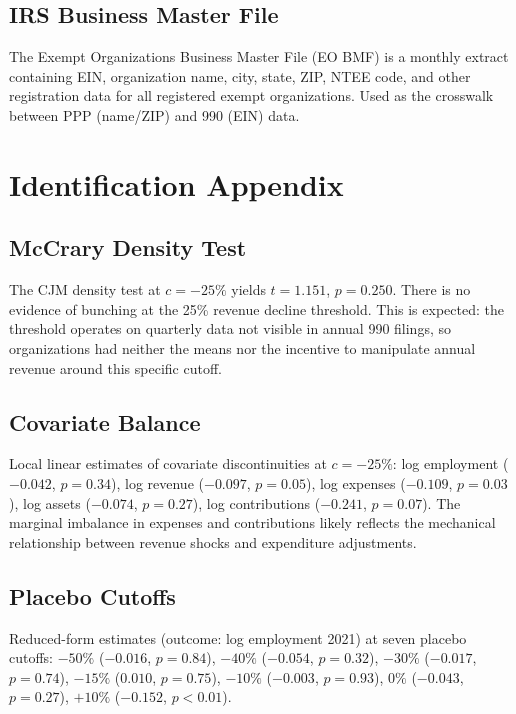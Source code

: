 \documentclass[12pt]{article}
\begin{document}
\subsection{IRS Business Master File}

The Exempt Organizations Business Master File (EO BMF) is a monthly extract containing EIN, organization name, city, state, ZIP, NTEE code, and other registration data for all registered exempt organizations. Used as the crosswalk between PPP (name/ZIP) and 990 (EIN) data.

\section{Identification Appendix}

\subsection{McCrary Density Test}

The CJM density test \citep{cattaneo2020density} at $c = -25\%$ yields $t = 1.151$, $p = 0.250$. There is no evidence of bunching at the 25\% revenue decline threshold. This is expected: the threshold operates on quarterly data not visible in annual 990 filings, so organizations had neither the means nor the incentive to manipulate annual revenue around this specific cutoff.

\subsection{Covariate Balance}

Local linear estimates of covariate discontinuities at $c = -25\%$: log employment ($-0.042$, $p = 0.34$), log revenue ($-0.097$, $p = 0.05$), log expenses ($-0.109$, $p = 0.03$), log assets ($-0.074$, $p = 0.27$), log contributions ($-0.241$, $p = 0.07$). The marginal imbalance in expenses and contributions likely reflects the mechanical relationship between revenue shocks and expenditure adjustments.

\subsection{Placebo Cutoffs}

Reduced-form estimates (outcome: log employment 2021) at seven placebo cutoffs: $-50\%$ ($-0.016$, $p = 0.84$), $-40\%$ ($-0.054$, $p = 0.32$), $-30\%$ ($-0.017$, $p = 0.74$), $-15\%$ ($0.010$, $p = 0.75$), $-10\%$ ($-0.003$, $p = 0.93$), $0\%$ ($-0.043$, $p = 0.27$), $+10\%$ ($-0.152$, $p < 0.01$).
\end{document}
